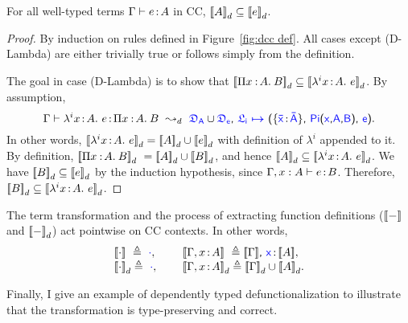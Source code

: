 \begin{lemma} For all well-typed terms $\Gamma \vdash e \hspace{0.5mm}{:}\hspace{0.5mm} A$ in CC, ${[\![ A ]\!]}_d \subseteq {[\![ e ]\!]}_d$.
\label{lem:subset}
\begin{proof}
By induction on rules defined in Figure~\ref{fig:dcc def}. 
All cases except (D-Lambda) are either trivially true or follows simply from the definition.

The goal in case (D-Lambda) is to show that ${[\![ \Pi x\mkern1.5mu{\hspace{0.5mm}{:}\hspace{0.5mm}} A.\hspace{0.8mm}B ]\!]}_d \subseteq {[\![ \lambda^{i}x\hspace{0.5mm}{:}\hspace{0.5mm}A.\ e ]\!]}_d$.
By assumption,
\begin{equation*}
\Gamma \vdash \lami{i}{x}{A}{e} \goodcolon \pitype{x}{A}{B}\ \leadsto_d\ \target{\fdef_A} \cup \target{\fdef_e} \sfcomma \itemdef{\target{\flabel_i}}{\itemtype{\bar{x}}{\bar{A}}}{\targetpi{x}{A}{B}}{\target{e}}.
\end{equation*}
In other words, ${[\![ \lambda^{i}x\hspace{0.5mm}{:}\hspace{0.5mm} A.\ e ]\!]}_d = {[\![ A ]\!]}_d \cup {[\![ e ]\!]}_d$ with definition of $\lambda^i$ appended to it. By definition, ${[\![ \Pi x\mkern1.5mu{\hspace{0.5mm}{:}\hspace{0.5mm}} A.\hspace{0.8mm}B ]\!]}_d\ = {[\![ A ]\!]}_d \cup {[\![ B ]\!]}_d$, and hence ${[\![ A ]\!]}_d \subseteq {[\![ \lambda^{i}x\hspace{0.5mm}{:}\hspace{0.5mm}A.\ e ]\!]}_d$. 
We have ${[\![ B ]\!]}_d \subseteq {[\![ e ]\!]}_d$ by the induction hypothesis, since $\Gamma, x:A \vdash e \hspace{0.5mm}{:}\hspace{0.5mm} B$. Therefore, ${[\![ B ]\!]}_d \subseteq {[\![ \lambda^{i}x\hspace{0.5mm}{:}\hspace{0.5mm}A.\ e ]\!]}_d$.
\end{proof}
\end{lemma}
The term transformation and the process of extracting function definitions (${[\![ - ]\!]}$ and ${[\![ - ]\!]}_d$) act pointwise on CC contexts. In other words,
\begin{equation*}
\begin{array}{l @{\qquad} l}
	\bbracket{\cdot}\ \triangleq\ \target{\cdot},\  & \bbracket{\Gamma, x \goodcolon A}\ \triangleq \bbracket{\Gamma}\sfcomma \target{x} \goodcolon \bbracket{A},\\
	\bbracket{\cdot}_d \triangleq\ \target{\cdot},\  & \bbracket{\Gamma, x \goodcolon A}_d \triangleq \bbracket{\Gamma}_d\cup\bbracket{A}_d.\\
\end{array}
\end{equation*}

Finally, I give an example of dependently typed defunctionalization to illustrate that the transformation is type-preserving and correct.

